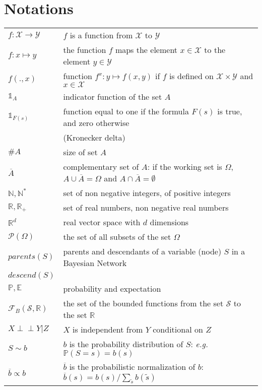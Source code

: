 \chapter*{Notations}

\pagestyle{plain}

\begin{supertabular}{ll}
  $f: \mathcal{X} \rightarrow \mathcal{Y}$ & $f$ is a function from $\mathcal{X}$ to $\mathcal{Y}$\\
  $f: x \mapsto y$ & the function $f$ maps the element $x\in\mathcal{X}$ to the element $y \in \mathcal{Y}$\\
  $f(.,x)$ & function $f^x: y \mapsto f(x,y)$ if $f$ is defined on $\mathcal{X} \times \mathcal{Y}$ and $x \in \mathcal{X}$\\
  $\mathds{1}_{A}$ & indicator function of the set $A$ \\
  $\mathds{1}_{F(s)}$ & function equal to one if the formula $F(s)$ is true, and zero otherwise\\
		&  (Kronecker delta)\\
  $\# A $ & size of set $A$ \\
  $\overline{A}$ & complementary set of $A$: if the working set is $\Omega$, $A \cup \overline{A} = \Omega$ and $A \cap \overline{A} = \emptyset$\\ 
  $\mathbb{N},\mathbb{N}^*$ & set of non negative integers, of positive integers\\
  $\mathbb{R},\mathbb{R}_+$ & set of real numbers, non negative real numbers \\ 
  $\mathbb{R}^d$   & real vector space with $d$ dimensions \\
  $\mathcal{P}(\Omega)$ & the set of all subsets of the set $\Omega$\\
  $parents(S)$ & parents and descendants of a variable (node) $S$ in a Bayesian Network\\
  $descend(S)$ & \\	
  $\mathbb{P},\mathbb{E}$ & probability and expectation \\
  $\mathcal{F}_{B}(\mathcal{S},\mathbb{R})$ & the set of the bounded functions from the set $\mathcal{S}$ to the set $\mathbb{R}$\\
  $X \perp\!\!\!\perp Y \vert Z$ & $X$ is independent from $Y$ conditional on $Z$\\
  $S \sim b$ & $b$ is the probability distribution of $S$: \textit{e.g.} $\mathbb{P}(S = s) = b(s)$\\
  $\overline{b} \propto b $ & $\overline{b}$ is the probabilistic normalization of $b$: $\overline{b}(s) = b(s)/\sum_{\tilde{s}} b(\tilde{s})$\\

\end{supertabular}
